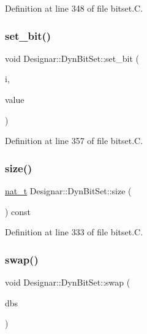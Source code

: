 Definition at line 348 of file bitset.\+C.

\mbox{\label{class_designar_1_1_dyn_bit_set_a3f9dc7630c5c25c85dffc260f3feccb3}} 
\subsubsection{\texorpdfstring{set\+\_\+bit()}{set\_bit()}}
{\footnotesize\ttfamily void Designar\+::\+Dyn\+Bit\+Set\+::set\+\_\+bit (\begin{DoxyParamCaption}\item[{\hyperlink{namespace_designar_aa72662848b9f4815e7bf31a7cf3e33d1}{nat\+\_\+t}}]{i,  }\item[{bool}]{value }\end{DoxyParamCaption})}



Definition at line 357 of file bitset.\+C.

\mbox{\label{class_designar_1_1_dyn_bit_set_a0107a8946533f6b8dc9a225a2f5b91a9}} 
\subsubsection{\texorpdfstring{size()}{size()}}
{\footnotesize\ttfamily \hyperlink{namespace_designar_aa72662848b9f4815e7bf31a7cf3e33d1}{nat\+\_\+t} Designar\+::\+Dyn\+Bit\+Set\+::size (\begin{DoxyParamCaption}{ }\end{DoxyParamCaption}) const}



Definition at line 333 of file bitset.\+C.

\mbox{\label{class_designar_1_1_dyn_bit_set_a376fe3b34a2a0c93bde8f33ff2947e64}} 
\subsubsection{\texorpdfstring{swap()}{swap()}}
{\footnotesize\ttfamily void Designar\+::\+Dyn\+Bit\+Set\+::swap (\begin{DoxyParamCaption}\item[{\hyperlink{class_designar_1_1_dyn_bit_set}{Dyn\+Bit\+Set} \&}]{dbs }\end{DoxyParamCaption})}



